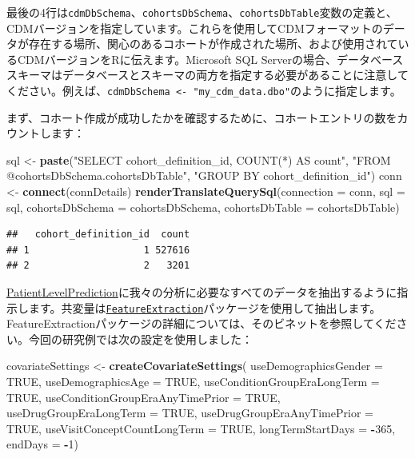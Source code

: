 \documentclass[
  11pt]{book}
\newenvironment{Shaded}{\begin{snugshade}}{\end{snugshade}}
\newcommand{\AttributeTok}[1]{\textcolor[rgb]{0.13,0.29,0.53}{#1}}
\newcommand{\ConstantTok}[1]{\textcolor[rgb]{0.56,0.35,0.01}{#1}}
\newcommand{\DecValTok}[1]{\textcolor[rgb]{0.00,0.00,0.81}{#1}}
\newcommand{\FunctionTok}[1]{\textcolor[rgb]{0.13,0.29,0.53}{\textbf{#1}}}
\newcommand{\NormalTok}[1]{#1}
\newcommand{\OtherTok}[1]{\textcolor[rgb]{0.56,0.35,0.01}{#1}}
\newcommand{\SpecialCharTok}[1]{\textcolor[rgb]{0.81,0.36,0.00}{\textbf{#1}}}
\newcommand{\StringTok}[1]{\textcolor[rgb]{0.31,0.60,0.02}{#1}}
\theoremstyle{definition}
\theoremstyle{definition}
\theoremstyle{definition}
\theoremstyle{definition}
\theoremstyle{remark}
\begin{document}
最後の4行は\texttt{cdmDbSchema}、\texttt{cohortsDbSchema}、\texttt{cohortsDbTable}変数の定義と、CDMバージョンを指定しています。これらを使用してCDMフォーマットのデータが存在する場所、関心のあるコホートが作成された場所、および使用されているCDMバージョンをRに伝えます。Microsoft SQL Serverの場合、データベーススキーマはデータベースとスキーマの両方を指定する必要があることに注意してください。例えば、\texttt{cdmDbSchema\ \textless{}-\ "my\_cdm\_data.dbo"}のように指定します。

まず、コホート作成が成功したかを確認するために、コホートエントリの数をカウントします：

\begin{Shaded}
\begin{Highlighting}[]
\NormalTok{sql }\OtherTok{\textless{}{-}} \FunctionTok{paste}\NormalTok{(}\StringTok{"SELECT cohort\_definition\_id, COUNT(*) AS count"}\NormalTok{,}
\StringTok{"FROM @cohortsDbSchema.cohortsDbTable"}\NormalTok{,}
\StringTok{"GROUP BY cohort\_definition\_id"}\NormalTok{)}
\NormalTok{conn }\OtherTok{\textless{}{-}} \FunctionTok{connect}\NormalTok{(connDetails)}
\FunctionTok{renderTranslateQuerySql}\NormalTok{(}\AttributeTok{connection =}\NormalTok{ conn,}
                        \AttributeTok{sql =}\NormalTok{ sql,}
                        \AttributeTok{cohortsDbSchema =}\NormalTok{ cohortsDbSchema,}
                        \AttributeTok{cohortsDbTable =}\NormalTok{ cohortsDbTable)}
\end{Highlighting}
\end{Shaded}

\begin{verbatim}
##   cohort_definition_id  count
## 1                    1 527616
## 2                    2   3201
\end{verbatim}

\href{https://ohdsi.github.io/PatientLevelPrediction/}{PatientLevelPrediction}に我々の分析に必要なすべてのデータを抽出するように指示します。共変量は\href{https://ohdsi.github.io/FeatureExtraction/}{\texttt{FeatureExtraction}}パッケージを使用して抽出します。FeatureExtractionパッケージの詳細については、そのビネットを参照してください。今回の研究例では次の設定を使用しました：

\begin{Shaded}
\begin{Highlighting}[]
\NormalTok{covariateSettings }\OtherTok{\textless{}{-}} \FunctionTok{createCovariateSettings}\NormalTok{(}
  \AttributeTok{useDemographicsGender =} \ConstantTok{TRUE}\NormalTok{,}
  \AttributeTok{useDemographicsAge =} \ConstantTok{TRUE}\NormalTok{,}
  \AttributeTok{useConditionGroupEraLongTerm =} \ConstantTok{TRUE}\NormalTok{,}
  \AttributeTok{useConditionGroupEraAnyTimePrior =} \ConstantTok{TRUE}\NormalTok{,}
  \AttributeTok{useDrugGroupEraLongTerm =} \ConstantTok{TRUE}\NormalTok{,}
  \AttributeTok{useDrugGroupEraAnyTimePrior =} \ConstantTok{TRUE}\NormalTok{,}
  \AttributeTok{useVisitConceptCountLongTerm =} \ConstantTok{TRUE}\NormalTok{,}
  \AttributeTok{longTermStartDays =} \SpecialCharTok{{-}}\DecValTok{365}\NormalTok{,}
  \AttributeTok{endDays =} \SpecialCharTok{{-}}\DecValTok{1}\NormalTok{)}
\end{Highlighting}
\end{Shaded}
\end{document}

